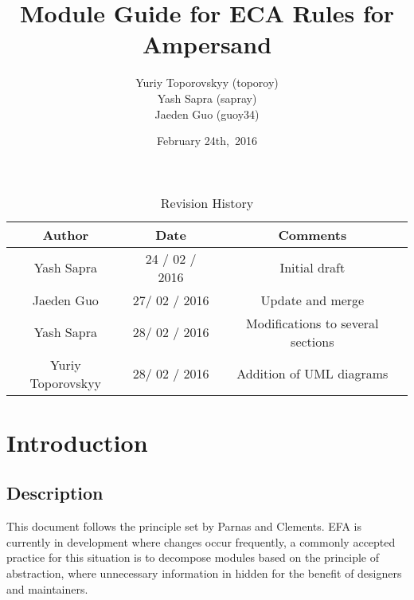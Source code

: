 \documentclass[12pt, svgnames]{article}
\begin{document}
\title{\vspace*{3cm} Module Guide for ECA Rules for Ampersand} 
\author{Yuriy Toporovskyy (toporoy)\\ Yash Sapra (sapray) \\ Jaeden Guo (guoy34)}
\date{February 24th,\ 2016} 


\maketitle
\newpage
\vspace*{1cm}
\begin{table}[ht!]\begin{center}
        \caption{Revision History}  
        \begin{tabular}{|c|c|c|}\hline
            \textbf{Author} & \textbf{Date} & \textbf{Comments} \\\hline 
            Yash Sapra & 24 / 02 / 2016 & Initial draft\\\hline
	 Jaeden Guo & 27/ 02 / 2016 & Update and merge \\\hline
	 Yash Sapra & 28/ 02 / 2016 & Modifications to several sections \\\hline
	 Yuriy Toporovskyy & 28/ 02 / 2016 & Addition of UML diagrams \\\hline
        \end{tabular}
    \end{center}\end{table}
\newpage

\tableofcontents

\newpage

\section{Introduction}
\subsection{Description}
This document follows the principle set by Parnas and Clements\citep{fakeIt}. 
EFA is currently in development where changes occur frequently, a 
commonly accepted practice for this situation is to decompose modules based on 
the principle of abstraction, where unnecessary information in hidden for the 
benefit of designers and maintainers\citep{modStruct,Parnas1972}.
 
\end{document}
